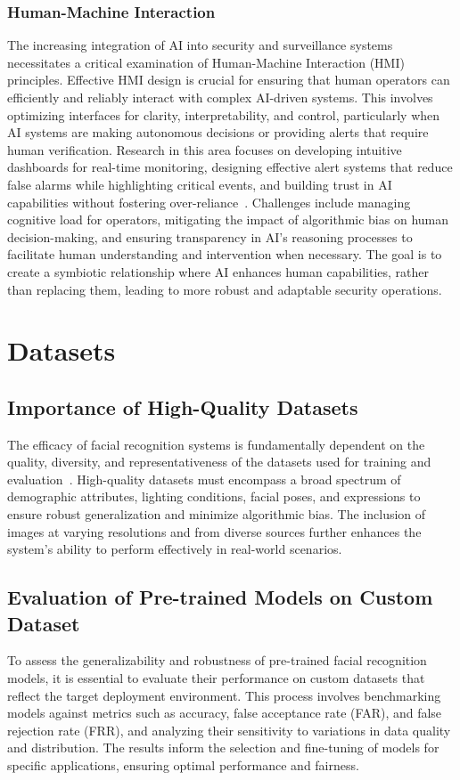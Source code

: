 \subsubsection{Human-Machine Interaction}
The increasing integration of AI into security and surveillance systems necessitates a critical examination of Human-Machine Interaction (HMI) principles. Effective HMI design is crucial for ensuring that human operators can efficiently and reliably interact with complex AI-driven systems. This involves optimizing interfaces for clarity, interpretability, and control, particularly when AI systems are making autonomous decisions or providing alerts that require human verification. Research in this area focuses on developing intuitive dashboards for real-time monitoring, designing effective alert systems that reduce false alarms while highlighting critical events, and building trust in AI capabilities without fostering over-reliance~\cite{securityindustry_2025_transforming}. Challenges include managing cognitive load for operators, mitigating the impact of algorithmic bias on human decision-making, and ensuring transparency in AI's reasoning processes to facilitate human understanding and intervention when necessary. The goal is to create a symbiotic relationship where AI enhances human capabilities, rather than replacing them, leading to more robust and adaptable security operations.

\section{Datasets}

\subsection{Importance of High-Quality Datasets}
The efficacy of facial recognition systems is fundamentally dependent on the quality, diversity, and representativeness of the datasets used for training and evaluation~\cite{kairos_secret_2018, geeksforgeeks_dataset_2025}. High-quality datasets must encompass a broad spectrum of demographic attributes, lighting conditions, facial poses, and expressions to ensure robust generalization and minimize algorithmic bias. The inclusion of images at varying resolutions and from diverse sources further enhances the system's ability to perform effectively in real-world scenarios.

\subsection{Evaluation of Pre-trained Models on Custom Dataset}
To assess the generalizability and robustness of pre-trained facial recognition models, it is essential to evaluate their performance on custom datasets that reflect the target deployment environment. This process involves benchmarking models against metrics such as accuracy, false acceptance rate (FAR), and false rejection rate (FRR), and analyzing their sensitivity to variations in data quality and distribution. The results inform the selection and fine-tuning of models for specific applications, ensuring optimal performance and fairness.